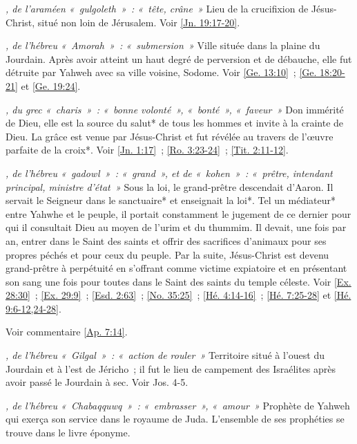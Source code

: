 \begin{multicols}{2}
\textit{, de l'araméen «~gulgoleth~»~: «~tête, crâne~»}\newline
Lieu de la crucifixion de Jésus-Christ, situé non loin de Jérusalem. Voir \vref{Jn. 19:17-20}.

\textit{, de l'hébreu «~Amorah~»~: «~submersion~»}\newline
Ville située dans la plaine du Jourdain. Après avoir atteint un haut degré de perversion et de débauche, elle fut détruite par Yahweh avec sa ville voisine, Sodome. Voir \vref{Ge. 13:10}~; \vref{Ge. 18:20-21} et \vref{Ge. 19:24}.

\textit{, du grec «~charis~»~: «~bonne volonté~», «~bonté~», «~faveur~»}\newline
Don immérité de Dieu, elle est la source du salut* de tous les hommes et invite à la crainte de Dieu. La grâce est venue par Jésus-Christ et fut révélée au travers de l'œuvre parfaite de la croix*. Voir \vref{Jn. 1:17}~; \vref{Ro. 3:23-24}~; \vref{Tit. 2:11-12}.

\textit{, de l'hébreu «~gadowl~»~: «~grand~», et de «~kohen~»~: «~prêtre, intendant principal, ministre d'état~»}\newline
Sous la loi, le grand-prêtre descendait d'Aaron. Il servait le Seigneur dans le sanctuaire* et enseignait la loi*. Tel un médiateur* entre Yahwhe et le peuple, il portait constamment le jugement de ce dernier pour qui il consultait Dieu au moyen de l'urim et du thummim. Il devait, une fois par an, entrer dans le Saint des saints et offrir des sacrifices d'animaux pour ses propres péchés et pour ceux du peuple. Par la suite, Jésus-Christ est devenu grand-prêtre à perpétuité en s'offrant comme victime expiatoire et en présentant son sang une fois pour toutes dans le Saint des saints du temple céleste. Voir \vref{Ex. 28:30}~; \vref{Ex. 29:9}~; \vref{Esd. 2:63}~; \vref{No. 35:25}~; \vref{Hé. 4:14-16}~; \vref{Hé. 7:25-28} et \vref{Hé. 9:6-12,24-28}.

\textit{}\newline
Voir commentaire \vref{Ap. 7:14}.

\textit{, de l'hébreu «~Gilgal~»~: «~action de rouler~»}\newline
Territoire situé à l'ouest du Jourdain et à l'est de Jéricho~; il fut le lieu de campement des Israélites après avoir passé le Jourdain à sec. Voir Jos. 4-5.

\textit{, de l'hébreu «~Chabaqquwq~»~: «~embrasser~», «~amour~»}\newline
Prophète de Yahweh qui exerça son service dans le royaume de Juda. L'ensemble de ses prophéties se trouve dans le livre éponyme.


\end{multicols}
